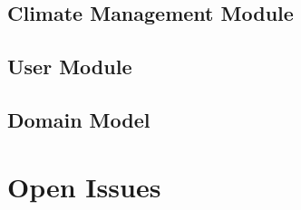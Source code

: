 \documentclass[a4paper,12pt]{article}
\begin{document}
		\subsection{Climate Management Module}
			
		
		\subsection{User Module}
		 
		
		\subsection{Domain Model}	
					
	\section{Open Issues}
	
	
	\listoffigures
	
\end{document}
